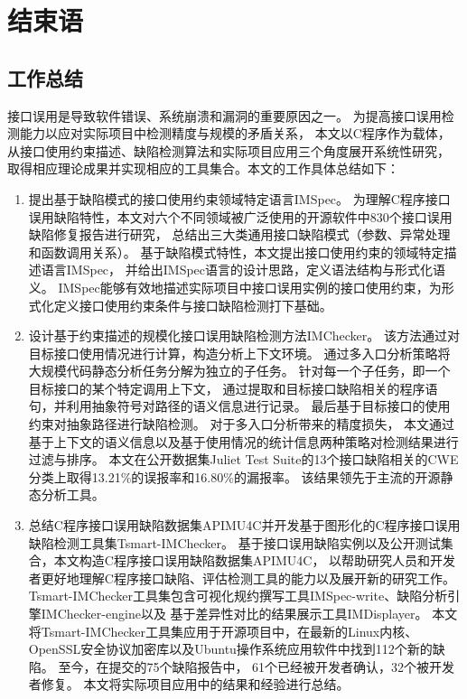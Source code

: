 \chapter{结束语}
\label{cha:con}

\section{工作总结}
接口误用是导致软件错误、系统崩溃和漏洞的重要原因之一。
为提高接口误用检测能力以应对实际项目中检测精度与规模的矛盾关系，
本文以C程序作为载体，从接口使用约束描述、缺陷检测算法和实际项目应用三个角度展开系统性研究，
取得相应理论成果并实现相应的工具集合。本文的工作具体总结如下：
\begin{enumerate}
	\item 提出基于缺陷模式的接口使用约束领域特定语言IMSpec。
	为理解C程序接口误用缺陷特性，本文对六个不同领域被广泛使用的开源软件中830个接口误用缺陷修复报告进行研究，
	总结出三大类通用接口缺陷模式（参数、异常处理和函数调用关系）。
	基于缺陷模式特性，本文提出接口使用约束的领域特定描述语言IMSpec，
	并给出IMSpec语言的设计思路，定义语法结构与形式化语义。
	IMSpec能够有效地描述实际项目中接口误用实例的接口使用约束，为形式化定义接口使用约束条件与接口缺陷检测打下基础。
	
	\item 设计基于约束描述的规模化接口误用缺陷检测方法IMChecker。
	该方法通过对目标接口使用情况进行计算，构造分析上下文环境。
	通过多入口分析策略将大规模代码静态分析任务分解为独立的子任务。
	针对每一个子任务，即一个目标接口的某个特定调用上下文，
	通过提取和目标接口缺陷相关的程序语句，并利用抽象符号对路径的语义信息进行记录。
	最后基于目标接口的使用约束对抽象路径进行缺陷检测。
	对于多入口分析带来的精度损失，
	本文通过基于上下文的语义信息以及基于使用情况的统计信息两种策略对检测结果进行过滤与排序。
	本文在公开数据集Juliet Test Suite的13个接口缺陷相关的CWE分类上取得13.21\%的误报率和16.80\%的漏报率。
	该结果领先于主流的开源静态分析工具。
	
	\item 总结C程序接口误用缺陷数据集APIMU4C并开发基于图形化的C程序接口误用缺陷检测工具集Tsmart-IMChecker。
	基于接口误用缺陷实例以及公开测试集合，本文构造C程序接口误用缺陷数据集APIMU4C，
	以帮助研究人员和开发者更好地理解C程序接口缺陷、评估检测工具的能力以及展开新的研究工作。
	Tsmart-IMChecker工具集包含可视化规约撰写工具IMSpec-write、缺陷分析引擎IMChecker-engine以及
	基于差异性对比的结果展示工具IMDisplayer。
	本文将Tsmart-IMChecker工具集应用于开源项目中，在最新的Linux内核、
	OpenSSL安全协议加密库以及Ubuntu操作系统应用软件中找到112个新的缺陷。
	至今，在提交的75个缺陷报告中，
	61个已经被开发者确认，32个被开发者修复。
	本文将实际项目应用中的结果和经验进行总结。
	
	
\end{enumerate}



